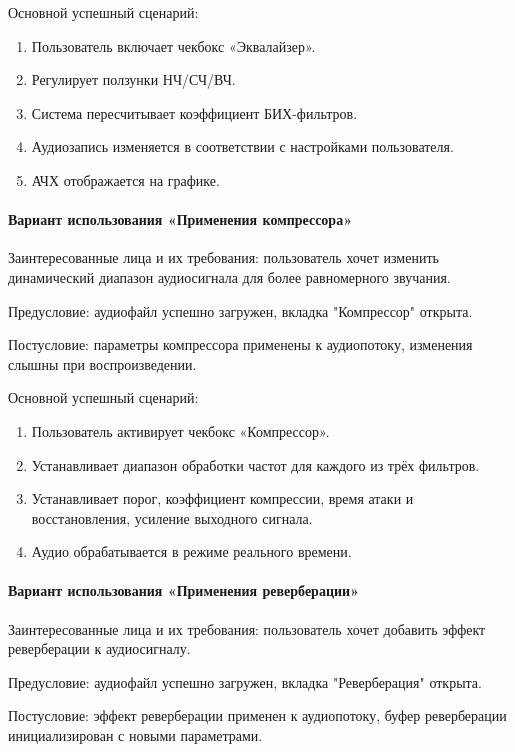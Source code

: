 Основной успешный сценарий:
\begin{enumerate}
	\item Пользователь включает чекбокс «Эквалайзер».
	\item Регулирует ползунки НЧ/СЧ/ВЧ.
	\item Система пересчитывает коэффициент БИХ-фильтров.
	\item Аудиозапись изменяется в соответствии с настройками пользователя.
	\item АЧХ отображается на графике.
\end{enumerate}

\paragraph{Вариант использования «Применения компрессора»}

Заинтересованные лица и их требования: пользователь хочет изменить динамический диапазон аудиосигнала для более равномерного звучания.

Предусловие: аудиофайл успешно загружен, вкладка "Компрессор" открыта.

Постусловие: параметры компрессора применены к аудиопотоку, изменения слышны при воспроизведении.

Основной успешный сценарий:
\begin{enumerate}
	\item Пользователь активирует чекбокс «Компрессор».
	\item Устанавливает диапазон обработки частот для каждого из трёх фильтров.
	\item Устанавливает порог, коэффициент компрессии, время атаки и восстановления, усиление выходного сигнала.
	\item Аудио обрабатывается в режиме реального времени.
\end{enumerate}

\paragraph{Вариант использования «Применения реверберации»}

Заинтересованные лица и их требования: пользователь хочет добавить эффект реверберации к аудиосигналу.

Предусловие: аудиофайл успешно загружен, вкладка "Реверберация" открыта.

Постусловие: эффект реверберации применен к аудиопотоку, буфер реверберации инициализирован с новыми параметрами.

